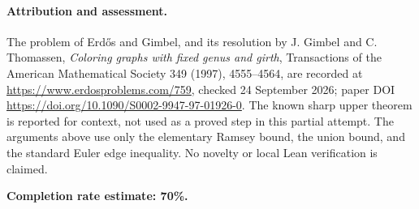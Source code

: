 \paragraph{Attribution and assessment.}
The problem of Erd\H{o}s and Gimbel, and its resolution by J. Gimbel and C. Thomassen, \emph{Coloring graphs with fixed genus and girth}, Transactions of the American Mathematical Society 349 (1997), 4555--4564, are recorded at \url{https://www.erdosproblems.com/759}, checked 24 September 2026; paper DOI \url{https://doi.org/10.1090/S0002-9947-97-01926-0}. The known sharp upper theorem is reported for context, not used as a proved step in this partial attempt. The arguments above use only the elementary Ramsey bound, the union bound, and the standard Euler edge inequality. No novelty or local Lean verification is claimed.

\textbf{Completion rate estimate: 70\%.}
